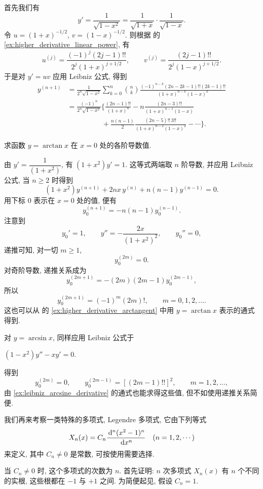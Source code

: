 首先我们有
$$
y'=\frac1{\sqrt{1-x^2}}
=\frac1{\sqrt{1+x}}\cdot\frac1{\sqrt{1-x}}.
$$
令 $u=(1+x)^{-1/2}$, $v=(1-x)^{-1/2}$.
则根据  的 \ref{ex:higher_derivative_linear_power}, 有
$$
u^{(j)}=\frac{(-1)^j(2j-1)!!}{2^j(1+x)^{j+1/2}},\qquad
v^{(j)}=\frac{(2j-1)!!}{2^j(1-x)^{j+1/2}}.
$$
于是对 $y'=uv$ 应用 Leibniz 公式, 得到
$$
\begin{aligned}
y^{(n+1)}
&=\frac1{2^n\sqrt{1-x^2}}
\sum_{k=0}^{n}\binom nk
\frac{(-1)^{n-k}(2n-2k-1)!!(2k-1)!!}
{(1+x)^{n-k}(1-x)^k}\\
&=\frac{(-1)^n}{2^n\sqrt{1-x^2}}
\Biggl\{
\frac{(2n-1)!!}{(1+x)^n}
-n\frac{(2n-3)!!}{(1+x)^{n-1}(1-x)}\\
&~~~~~~~~~~~~~\qquad+\frac{n(n-1)}{2}
\frac{(2n-5)!!\,3!!}{(1+x)^{n-2}(1-x)^2}
-\cdots\Biggr\}.
\end{aligned}
$$
\par\endgroup

\label{ex:arctangent_derivatives_at_zero}
求函数 $y=\arctan x$ 在 $x=0$ 处的各阶导数值.

由 $y'=\dfrac{1}{(1+x^2)}$, 有
$
(1+x^2)y'=1.
$
这等式两端取 $n$ 阶导数, 并应用 Leibniz 公式,
当 $n\geq2$ 时得到
$$
(1+x^2)y^{(n+1)}+2nx\,y^{(n)}+n(n-1)y^{(n-1)}=0.
$$
用下标 0 表示在 $x=0$ 处的值, 便有
$$
y_0^{(n+1)}=-n(n-1)y_0^{(n-1)}.
$$
注意到
$$
y_0'=1,\qquad
y''=-\frac{2x}{(1+x^2)^2},\qquad y_0''=0,
$$
递推可知, 对一切 $m\geq1$,
$$
y_0^{(2m)}=0.
$$
对奇阶导数, 递推关系成为
$$
y_0^{(2m+1)}=-(2m)(2m-1)y_0^{(2m-1)},
$$
所以
$$
y_0^{(2m+1)}=(-1)^m(2m)!,\qquad m=0,1,2,\ldots.
$$
这也可以从  的 \ref{ex:higher_derivative_arctangent}
中用 $y=\arctan x$ 表示的通式得到.

\label{ex:arcsine_derivatives_at_zero}
对 $y=\arcsin x$, 同样应用 Leibniz 公式于
\begin{center}
$
(1-x^2)y''-xy'=0.
$\end{center}
得到
$$
y_0^{(2m)}=0,\qquad
y_0^{(2m-1)}=[(2m-1)!!]^2,\qquad m=1,2,\ldots,
$$
由 \ref{ex:leibniz_arcsine_derivative} 的通式也能求得这些值,
但不如使用递推关系简便.

\label{ex:legendre_polynomial_roots}
我们再来考察一类特殊的多项式, Legendre 多项式, 它由下列等式
$$
X_n(x) = C_n \frac{\,\mathrm{d}^n (x^2 - 1)^n}{\,\mathrm{d} x^n} \quad (n=1, 2, \cdots)
$$
来定义, 其中 $C_n\neq0$ 是常数, 可按使用需要选择.

当 $C_n\neq0$ 时, 这个多项式的次数为 $n$. 
首先证明: $n$ 次多项式 $X_n(x)$ 有 $n$ 个不同的实根, 这些根都在 $-1$ 与 $+1$ 之间.
为简便起见, 假设 $C_n = 1$.

